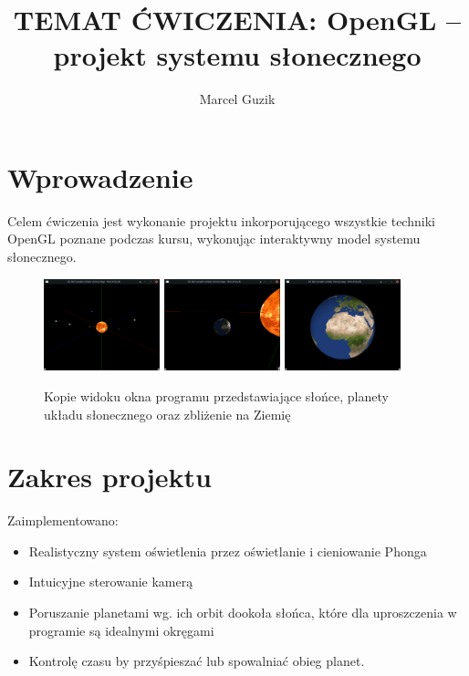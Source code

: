 \documentclass[a4paper]{article}
\title{TEMAT ĆWICZENIA: OpenGL – projekt systemu słonecznego}
\author{Marcel Guzik}
\begin{document}
\section{Wprowadzenie}

Celem ćwiczenia jest wykonanie projektu inkorporującego wszystkie techniki
OpenGL poznane podczas kursu, wykonując interaktywny model systemu słonecznego.

\begin{figure}[H]
      \centering
      \includegraphics[width=0.3\textwidth]{img/1}
      \includegraphics[width=0.3\textwidth]{img/2}
      \includegraphics[width=0.3\textwidth]{img/3}
      \caption{Kopie widoku okna programu przedstawiające słońce, planety układu
            słonecznego oraz zbliżenie na Ziemię}
\end{figure}

\section{Zakres projektu}

Zaimplementowano:

\begin{itemize}
      \item Realistyczny system oświetlenia przez oświetlanie i cieniowanie
            Phonga
      \item Intuicyjne sterowanie kamerą
      \item Poruszanie planetami wg. ich orbit dookoła słońca, które dla
            uproszczenia w programie są idealnymi okręgami
      \item Kontrolę czasu by przyśpieszać lub spowalniać obieg planet.
\end{itemize}
\end{document}
